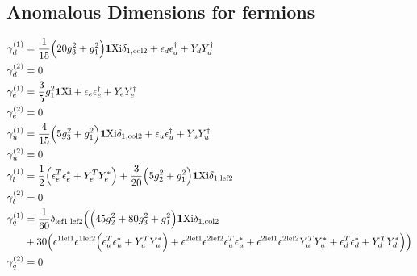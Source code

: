\subsection{Anomalous Dimensions for fermions}
{\allowdisplaybreaks \begin{align} 
\gamma_{d}^{(1)} & =  
\frac{1}{15} \Big(20 g_{3}^{2}  + g_{1}^{2}\Big){\bf 1} \text{Xi} \delta_{1,\text{col2}}  + {\epsilon_d  \epsilon_{d}^{\dagger}} + {Y_d  Y_{d}^{\dagger}}\\ 
\gamma_{d}^{(2)} & =  
0\\ 
\gamma_{e}^{(1)} & =  
\frac{3}{5} g_{1}^{2} {\bf 1} \text{Xi}  + {\epsilon_e  \epsilon_{e}^{\dagger}} + {Y_e  Y_{e}^{\dagger}}\\ 
\gamma_{e}^{(2)} & =  
0\\ 
\gamma_{u}^{(1)} & =  
\frac{4}{15} \Big(5 g_{3}^{2}  + g_{1}^{2}\Big){\bf 1} \text{Xi} \delta_{1,\text{col2}}  + {\epsilon_u  \epsilon_{u}^{\dagger}} + {Y_u  Y_{u}^{\dagger}}\\ 
\gamma_{u}^{(2)} & =  
0\\ 
\gamma_{l}^{(1)} & =  
\frac{1}{2} \Big({\epsilon_{e}^{T}  \epsilon_e^*} + {Y_{e}^{T}  Y_e^*}\Big) + \frac{3}{20} \Big(5 g_{2}^{2}  + g_{1}^{2}\Big){\bf 1} \text{Xi} \delta_{1,\text{lef2}} \\ 
\gamma_{l}^{(2)} & =  
0\\ 
\gamma_{q}^{(1)} & =  
\frac{1}{60} \delta_{\text{lef1},\text{lef2}} \Big(\Big(45 g_{2}^{2}  + 80 g_{3}^{2}  + g_{1}^{2}\Big){\bf 1} \text{Xi} \delta_{1,\text{col2}} \nonumber \\ 
 &+30 \Big(\epsilon^{{1 \text{lef1}}} \epsilon^{{1 \text{lef2}}} \Big({\epsilon_{u}^{T}  \epsilon_u^*} + {Y_{u}^{T}  Y_u^*}\Big) + \epsilon^{{2 \text{lef1}}} \epsilon^{{2 \text{lef2}}} {\epsilon_{u}^{T}  \epsilon_u^*}  + \epsilon^{{2 \text{lef1}}} \epsilon^{{2 \text{lef2}}} {Y_{u}^{T}  Y_u^*}  + {\epsilon_{d}^{T}  \epsilon_d^*} + {Y_{d}^{T}  Y_d^*}\Big)\Big)\\ 
\gamma_{q}^{(2)} & =  
0
\end{align} } 
